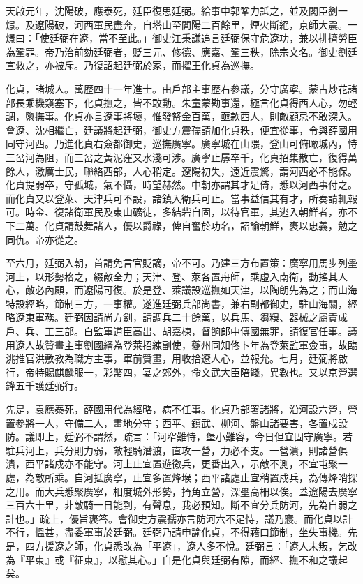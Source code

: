 \begin{pinyinscope}
天啟元年，沈陽破，應泰死，廷臣復思廷弼。給事中郭鞏力詆之，並及閣臣劉一燝。及遼陽破，河西軍民盡奔，自塔山至閭陽二百餘里，煙火斷絕，京師大震。一燝曰：「使廷弼在遼，當不至此。」御史江秉謙追言廷弼保守危遼功，兼以排擠勞臣為鞏罪。帝乃治前劾廷弼者，貶三元、修德、應嘉、鞏三秩，除宗文名。御史劉廷宣救之，亦被斥。乃復詔起廷弼於家，而擢王化貞為巡撫。

化貞，諸城人。萬歷四十一年進士。由戶部主事歷右參議，分守廣寧。蒙古炒花諸部長乘機窺塞下，化貞撫之，皆不敢動。朱童蒙勘事還，極言化貞得西人心，勿輕調，隳撫事。化貞亦言遼事將壞，惟發帑金百萬，亟款西人，則敵顧忌不敢深入。會遼、沈相繼亡，廷議將起廷弼，御史方震孺請加化貞秩，便宜從事，令與薛國用同守河西。乃進化貞右僉都御史，巡撫廣寧。廣寧城在山隈，登山可俯瞰城內，恃三岔河為阻，而三岔之黃泥窪又水淺可涉。廣寧止孱卒千，化貞招集散亡，復得萬餘人，激厲士民，聯絡西部，人心稍定。遼陽初失，遠近震驚，謂河西必不能保。化貞提弱卒，守孤城，氣不懾，時望赫然。中朝亦謂其才足倚，悉以河西事付之。而化貞又以登萊、天津兵可不設，諸鎮入衛兵可止。當事益信其有才，所奏請輒報可。時金、復諸衛軍民及東山礦徒，多結砦自固，以待官軍，其逃入朝鮮者，亦不下二萬。化貞請鼓舞諸人，優以爵祿，俾自奮於功名，詔諭朝鮮，褒以忠義，勉之同仇。帝亦從之。

至六月，廷弼入朝，首請免言官貶謫，帝不可。乃建三方布置策：廣寧用馬步列壘河上，以形勢格之，綴敵全力；天津、登、萊各置舟師，乘虛入南衛，動搖其人心，敵必內顧，而遼陽可復。於是登、萊議設巡撫如天津，以陶朗先為之；而山海特設經略，節制三方，一事權。遂進廷弼兵部尚書，兼右副都御史，駐山海關，經略遼東軍務。廷弼因請尚方劍，請調兵二十餘萬，以兵馬、芻糗、器械之屬責成戶、兵、工三部。白監軍道臣高出、胡嘉棟，督餉郎中傅國無罪，請復官任事。議用遼人故贊畫主事劉國縉為登萊招練副使，夔州同知佟卜年為登萊監軍僉事，故臨洮推官洪敷教為職方主事，軍前贊畫，用收拾遼人心，並報允。七月，廷弼將啟行，帝特賜麒麟服一，彩幣四，宴之郊外，命文武大臣陪餞，異數也。又以京營選鋒五千護廷弼行。

先是，袁應泰死，薛國用代為經略，病不任事。化貞乃部署諸將，沿河設六營，營置參將一人，守備二人，畫地分守；西平、鎮武、柳河、盤山諸要害，各置戍設防。議即上，廷弼不謂然，疏言：「河窄難恃，堡小難容，今日但宜固守廣寧。若駐兵河上，兵分則力弱，敵輕騎潛渡，直攻一營，力必不支。一營潰，則諸營俱潰，西平諸戍亦不能守。河上止宜置遊徼兵，更番出入，示敵不測，不宜屯聚一處，為敵所乘。自河抵廣寧，止宜多置烽堠；西平諸處止宜稍置戍兵，為傳烽哨探之用。而大兵悉聚廣寧，相度城外形勢，掎角立營，深壘高柵以俟。蓋遼陽去廣寧三百六十里，非敵騎一日能到，有聲息，我必預知。斷不宜分兵防河，先為自弱之計也。」疏上，優旨褒答。會御史方震孺亦言防河六不足恃，議乃寢。而化貞以計不行，慍甚，盡委軍事於廷弼。廷弼乃請申諭化貞，不得藉口節制，坐失事機。先是，四方援遼之師，化貞悉改為「平遼」，遼人多不悅。廷弼言：「遼人未叛，乞改為『平東』或『征東』，以慰其心。」自是化貞與廷弼有隙，而經、撫不和之議起矣。


\end{pinyinscope}
